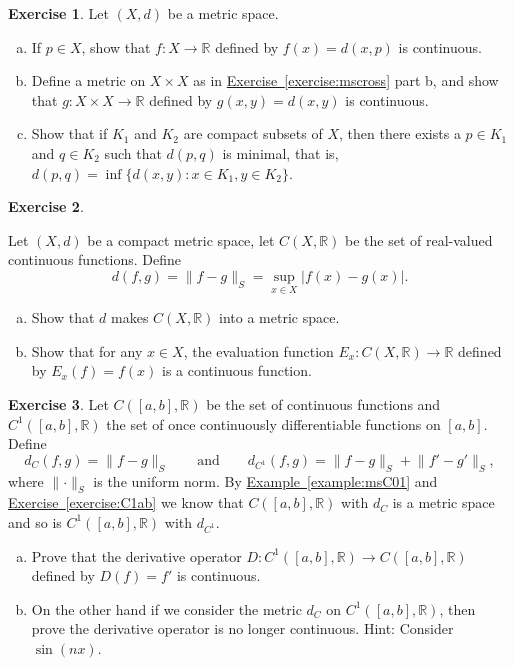 \documentclass[12pt,openany]{book}
\newcommand{\snorm}[1]{\lVert {#1} \rVert}
\newcommand{\abs}[1]{\left\lvert {#1} \right\rvert}
\newcommand{\R}{{\mathbb{R}}}
\theoremstyle{plain}
\theoremstyle{remark}
\theoremstyle{definition}
\newenvironment{exbox}{%
    \def\FrameCommand{\vrule width 1pt \relax\hspace{10pt}}%
    \MakeFramed{\advance\hsize-\width\FrameRestore}%
}{%
    \endMakeFramed
}
\newenvironment{exparts}{%
    \leavevmode\begin{enumerate}[a),noitemsep,topsep=0pt,parsep=0pt,partopsep=0pt]
}{%
    \end{enumerate}
}
\theoremstyle{exercise}
\newtheorem{exercise}{Exercise}[section]
\theoremstyle{example}
\newcommand{\exerciseref}[1]{\hyperref[#1]{Exercise~\ref*{#1}}}
\newcommand{\exampleref}[1]{\hyperref[#1]{Example~\ref*{#1}}}
\begin{document}
\begin{exbox}
\begin{samepage}
\begin{exercise}
Let $(X,d)$ be a metric space.
\begin{exparts}
\item
If $p \in X$,
show that $f \colon X \to \R$ defined
by $f(x) = d(x,p)$ is continuous.
\item
Define a metric on $X \times X$ as in \exerciseref{exercise:mscross} part
b, and show that $g \colon X \times X \to \R$ defined by
$g(x,y) = d(x,y)$ is continuous.
\item
Show that if $K_1$ and $K_2$ are compact subsets of $X$, then
there exists a $p \in K_1$ and $q \in K_2$ such that $d(p,q)$ is minimal,
that is, $d(p,q) = \inf \{ d(x,y) \colon x \in K_1, y \in K_2 \}$.
\end{exparts}
\end{exercise}
\end{samepage}

\begin{exercise}
\begin{samepage}
Let $(X,d)$ be a compact metric space, let $C(X,\R)$ be the set
of real-valued continuous functions.  Define
\begin{equation*}
d(f,g) = \snorm{f-g}_S = \sup_{x \in X} \abs{f(x)-g(x)} .
\end{equation*}
\begin{exparts}
\item
Show that $d$ makes $C(X,\R)$ into a metric space.
\item
Show that for any $x \in X$, the evaluation function
$E_x \colon C(X,\R) \to \R$ defined by $E_x(f) = f(x)$
is a continuous function.
\end{exparts}
\end{samepage}
\end{exercise}

\begin{samepage}
\begin{exercise}
Let $C([a,b],\R)$ be the set of continuous functions and
$C^1([a,b],\R)$ the set of once continuously differentiable
functions on $[a,b]$.
Define
\begin{equation*}
d_{C}(f,g) = \snorm{f-g}_S
\qquad \text{and} \qquad
d_{C^1}(f,g) = \snorm{f-g}_S + \snorm{f'-g'}_S,
\end{equation*}
where $\snorm{\cdot}_S$ is the uniform norm.
By \exampleref{example:msC01} and \exerciseref{exercise:C1ab} we know that
$C([a,b],\R)$ with $d_C$ is a metric space and
so is
$C^1([a,b],\R)$ with $d_{C^1}$.
\begin{exparts}
\item
Prove that the derivative operator $D \colon 
C^1([a,b],\R) \to C([a,b],\R)$ defined by
$D(f) = f'$ is continuous.
\item
On the other hand if we consider the metric $d_C$ on $C^1([a,b],\R)$,
then prove the derivative operator is no longer continuous.  Hint: Consider
$\sin(n x)$.
\end{exparts}
\end{exercise}
\end{samepage}


\end{exbox}
\end{document}
